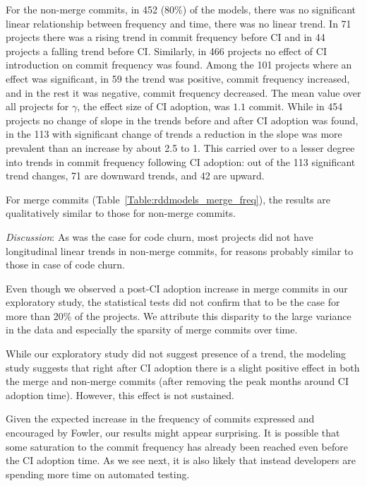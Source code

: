 For the non-merge commits, in 452 (80\%) of the models, there was no significant linear relationship 
between  frequency and time, \ie there was no linear trend.
In 71 projects there was a rising trend in commit frequency before CI 
and in 44 projects a falling trend before CI.
Similarly, in 466 projects no effect of CI introduction on commit frequency 
was found. 
Among the 101 projects where an effect was significant, in 59 the trend 
was positive, \ie commit frequency increased, and in the rest it was 
negative, \ie commit frequency decreased.
The mean value over all projects for $\gamma$, the effect size of CI 
adoption, was $1.1$ commit.
While in 454 projects no change of slope in the trends before and after CI 
adoption was found, in the 113 with significant change of trends a reduction 
in the slope was more prevalent than an increase by about 2.5 to 1.
This carried over to a lesser degree into trends in commit frequency 
following CI adoption: out of the 113 significant trend changes, 71 are 
downward trends, and 42 are upward.

For merge commits (Table~\ref{Table:rddmodels_merge_freq}), the results 
are qualitatively similar to those for non-merge commits.

\smallskip\noindent \emph{Discussion}:
As was the case for code churn, most projects did not have longitudinal 
linear trends in non-merge commits, for reasons probably similar to those 
in case of code churn.

Even though  we observed a post-CI adoption increase in merge commits 
in our exploratory study, the statistical tests did not confirm that to be the 
case for more than 20\% of the projects. 
We attribute this disparity to the large variance in the data and especially 
the sparsity of merge commits over time. 

While our exploratory study did not suggest presence of a trend, the 
modeling study suggests that right after CI adoption there is a slight 
positive effect in both the merge and non-merge commits (after removing the peak months around CI adoption time). 
However, this effect is not sustained.

Given the expected increase in the frequency of commits expressed and 
encouraged by Fowler, our results might appear surprising.
It is possible that some saturation to the commit frequency has already 
been reached even before the CI adoption time.
As we see next, it is also likely that instead developers are spending more time on 
automated testing.


